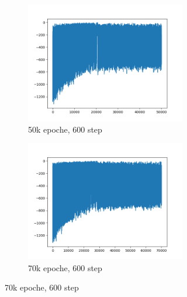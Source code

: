 \begin{figure}[H]
\begin{subfigure}{\textwidth}
\begin{subfigure}{.33\textwidth}
			\includegraphics[width=1\linewidth]{img/plot_50k_600_cattivo.png}
			\caption{50k epoche, 600 step}
		\end{subfigure}%
		\begin{subfigure}{.33\textwidth}
			\centering
			\includegraphics[width=1\linewidth]{img/plot_70k_600.png}
			\caption{70k epoche, 600 step}
		\end{subfigure}%
	\end{subfigure}
	\begin{subfigure}{\textwidth}
		\centering
		\begin{subfigure}{.33\textwidth}
			\centering

\end{subfigure}
\end{subfigure}
\end{figure}
